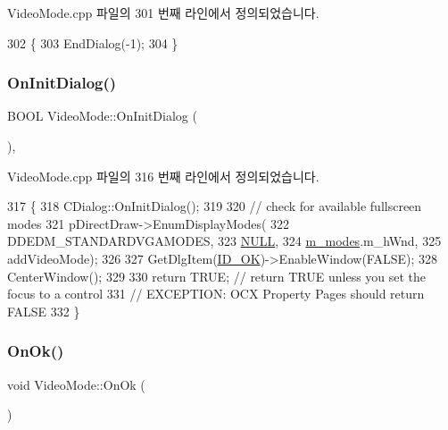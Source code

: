 Video\+Mode.\+cpp 파일의 301 번째 라인에서 정의되었습니다.


\begin{DoxyCode}
302 \{
303   EndDialog(-1);
304 \}
\end{DoxyCode}
\mbox{\label{class_video_mode_acb6a1c86e30e641be5e8d7f904547deb}} 
\subsubsection{\texorpdfstring{On\+Init\+Dialog()}{OnInitDialog()}}
{\footnotesize\ttfamily B\+O\+OL Video\+Mode\+::\+On\+Init\+Dialog (\begin{DoxyParamCaption}{ }\end{DoxyParamCaption})\hspace{0.3cm}{\ttfamily [protected]}, {\ttfamily [virtual]}}



Video\+Mode.\+cpp 파일의 316 번째 라인에서 정의되었습니다.


\begin{DoxyCode}
317 \{
318   CDialog::OnInitDialog();
319   
320   \textcolor{comment}{// check for available fullscreen modes}
321   pDirectDraw->EnumDisplayModes(
322       DDEDM\_STANDARDVGAMODES,
323       \mbox{\hyperlink{getopt1_8c_a070d2ce7b6bb7e5c05602aa8c308d0c4}{NULL}},
324       \mbox{\hyperlink{class_video_mode_a89d4dd07ee169f0f6f4f845582fa3695}{m\_modes}}.m\_hWnd,
325       addVideoMode);
326   
327   GetDlgItem(\mbox{\hyperlink{resource_8h_a4cf7b8af561e85b223c39c4c2b22ef18}{ID\_OK}})->EnableWindow(FALSE);      
328   CenterWindow();
329 
330   \textcolor{keywordflow}{return} TRUE;  \textcolor{comment}{// return TRUE unless you set the focus to a control}
331                 \textcolor{comment}{// EXCEPTION: OCX Property Pages should return FALSE}
332 \}
\end{DoxyCode}
\mbox{\label{class_video_mode_af9bcacc26657ea8610ae926f14fc648e}} 
\subsubsection{\texorpdfstring{On\+Ok()}{OnOk()}}
{\footnotesize\ttfamily void Video\+Mode\+::\+On\+Ok (\begin{DoxyParamCaption}{ }\end{DoxyParamCaption})\hspace{0.3cm}{\ttfamily [protected]}}



